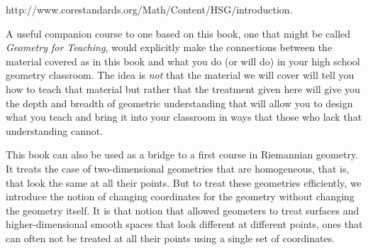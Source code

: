 \documentclass{ximera}
\begin{document}
\begin{center}
http://www.corestandards.org/Math/Content/HSG/introduction.
\end{center}

A useful companion course to one based on this book, one that might be
called \textit{Geometry for Teaching}, would explicitly make the
connections between the material covered as in this book and what you
do (or will do) in your high school geometry classroom. The idea is
\textit{not} that the material we will cover will tell you how to
teach that material but rather that the treatment given here will give
you the depth and breadth of geometric understanding that will allow
you to design what you teach and bring it into your classroom in ways
that those who lack that understanding cannot.

\begin{remark}
This book can also be used as a bridge to a first course in Riemannian
geometry. It treats the case of two-dimensional geometries that are
homogeneous, that is, that look the same at all their points. But to treat
these geometries efficiently, we introduce the notion of changing coordinates
for the geometry without changing the geometry itself. It is that notion that
allowed geometers to treat surfaces and higher-dimensional smooth spaces that
look different at different points, ones that can often not be treated at all
their points using a single set of coordinates.
\end{remark}
\end{document}
